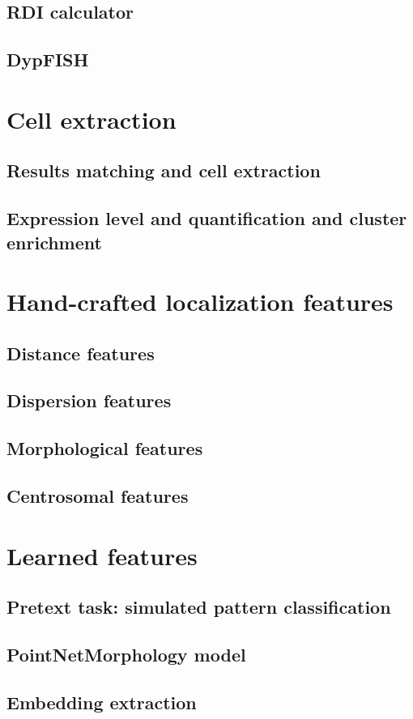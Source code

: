 \subsection{RDI calculator}

\subsection{DypFISH}


\section{Cell extraction}


\subsection{Results matching and cell extraction}

\subsection{Expression level and quantification and cluster enrichment}


\section{Hand-crafted localization features}


\subsection{Distance features}

\subsection{Dispersion features}

\subsection{Morphological features}

\subsection{Centrosomal features}


\section{Learned features}


\subsection{Pretext task: simulated pattern classification}

\subsection{PointNetMorphology model}

\subsection{Embedding extraction}
